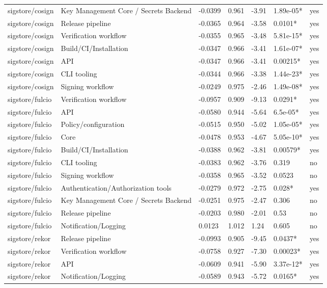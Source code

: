 \begin{table}[t]
\begin{tabular}{lllllll}
sigstore/cosign & Key Management Core / Secrets Backend & -0.0399 & 0.961 & -3.91 & 1.89e-05* & yes \\
sigstore/cosign & Release pipeline & -0.0365 & 0.964 & -3.58 & 0.0101* & yes \\
sigstore/cosign & Verification workflow & -0.0355 & 0.965 & -3.48 & 5.81e-15* & yes \\
sigstore/cosign & Build/CI/Installation & -0.0347 & 0.966 & -3.41 & 1.61e-07* & yes \\
sigstore/cosign & API & -0.0347 & 0.966 & -3.41 & 0.00215* & yes \\
sigstore/cosign & CLI tooling & -0.0344 & 0.966 & -3.38 & 1.44e-23* & yes \\
sigstore/cosign & Signing workflow & -0.0249 & 0.975 & -2.46 & 1.49e-08* & yes \\
sigstore/fulcio & Verification workflow & -0.0957 & 0.909 & -9.13 & 0.0291* & yes \\
sigstore/fulcio & API & -0.0580 & 0.944 & -5.64 & 6.5e-05* & yes \\
sigstore/fulcio & Policy/configuration & -0.0515 & 0.950 & -5.02 & 1.05e-05* & yes \\
sigstore/fulcio & Core & -0.0478 & 0.953 & -4.67 & 5.05e-10* & yes \\
sigstore/fulcio & Build/CI/Installation & -0.0388 & 0.962 & -3.81 & 0.00579* & yes \\
sigstore/fulcio & CLI tooling & -0.0383 & 0.962 & -3.76 & 0.319 & no \\
sigstore/fulcio & Signing workflow & -0.0358 & 0.965 & -3.52 & 0.0523 & no \\
sigstore/fulcio & Authentication/Authorization tools & -0.0279 & 0.972 & -2.75 & 0.028* & yes \\
sigstore/fulcio & Key Management Core / Secrets Backend & -0.0251 & 0.975 & -2.47 & 0.306 & no \\
sigstore/fulcio & Release pipeline & -0.0203 & 0.980 & -2.01 & 0.53 & no \\
sigstore/fulcio & Notification/Logging & 0.0123 & 1.012 & 1.24 & 0.605 & no \\
sigstore/rekor & Release pipeline & -0.0993 & 0.905 & -9.45 & 0.0437* & yes \\
sigstore/rekor & Verification workflow & -0.0758 & 0.927 & -7.30 & 0.00023* & yes \\
sigstore/rekor & API & -0.0609 & 0.941 & -5.90 & 3.37e-12* & yes \\
sigstore/rekor & Notification/Logging & -0.0589 & 0.943 & -5.72 & 0.0165* & yes \\

\end{tabular}
\end{table}
